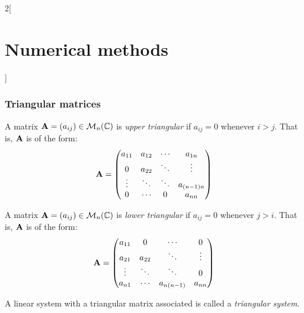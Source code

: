 \documentclass[../../../main.tex]{subfiles}
\begin{document}
\begin{multicols}{2}[\section{Numerical methods}]
  \subsubsection{Triangular matrices}
  \begin{definition}
    A matrix $\boldsymbol{\mathrm{A}}=(a_{ij})\in\mathcal{M}_n(\mathbb{C})$ is \emph{upper triangular} if $a_{ij}=0$ whenever $i>j$. That is, $\boldsymbol{\mathrm{A}}$ is of the form:
    $$\boldsymbol{\mathrm{A}}=
      \begin{pmatrix}
        a_{11} & a_{12} & \cdots & a_{1n}     \\
        0      & a_{22} & \ddots & \vdots     \\
        \vdots & \ddots & \ddots & a_{(n-1)n} \\
        0      & \cdots & 0      & a_{nn}
      \end{pmatrix}
    $$
  \end{definition}
  \begin{definition}
    A matrix $\boldsymbol{\mathrm{A}}=(a_{ij})\in\mathcal{M}_n(\mathbb{C})$ is \emph{lower triangular} if $a_{ij}=0$ whenever $j>i$. That is, $\boldsymbol{\mathrm{A}}$ is of the form:
    $$\boldsymbol{\mathrm{A}}=
      \begin{pmatrix}
        a_{11} & 0      & \cdots     & 0      \\
        a_{21} & a_{22} & \ddots     & \vdots \\
        \vdots & \ddots & \ddots     & 0      \\
        a_{n1} & \cdots & a_{n(n-1)} & a_{nn}
      \end{pmatrix}
    $$
  \end{definition}
  \begin{definition}
    A linear system with a triangular matrix associated is called a \emph{triangular system}.
  \end{definition}

\end{multicols}
\end{document}
